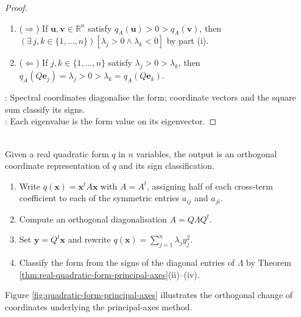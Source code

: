 \begin{theorem}
\begin{proof}
\begin{enumerate}[label=(\roman*)]
\item[$(iv)$] ($\Rightarrow$) If $\mathbf{u},\mathbf{v}\in\mathbb{R}^n$ satisfy $q_A(\mathbf{u})>0>q_A(\mathbf{v})$, then $(\exists\,j,k\in\{1,\ldots,n\})[\lambda_j>0\land\lambda_k<0]$ by part (i).
\item[$(iv)$] ($\Leftarrow$) If $j,k\in\{1,\ldots,n\}$ satisfy $\lambda_j>0>\lambda_k$, then $q_A(Q\mathbf{e}_j)=\lambda_j>0>\lambda_k=q_A(Q\mathbf{e}_k)$.
\end{enumerate}
: Spectral coordinates diagonalise the form; coordinate vectors and the square sum classify its signs.\\
: Each eigenvalue is the form value on its eigenvector.
\end{proof}
\end{theorem}

\begin{computationmethod} \label{meth:quadratic-form-principal-axes} \\
Given a real quadratic form $q$ in $n$ variables, the output is an orthogonal coordinate representation of $q$ and its sign classification.
\begin{enumerate}[label=(\roman*)]
\setlength{\itemsep}{0pt}
\item Write $q(\mathbf{x})=\mathbf{x}^tA\mathbf{x}$ with $A=A^t$, assigning half of each cross-term coefficient to each of the symmetric entries $a_{ij}$ and $a_{ji}$.
\item Compute an orthogonal diagonalisation $A=Q\Lambda Q^t$.
\item Set $\mathbf{y}=Q^t\mathbf{x}$ and rewrite $q(\mathbf{x})=\sum\limits_{j=1}^{n}\lambda_jy_j^2$.
\item Classify the form from the signs of the diagonal entries of $\Lambda$ by Theorem \ref{thm:real-quadratic-form-principal-axes}(ii)--(iv).
\end{enumerate}
\end{computationmethod}

Figure \ref{fig:quadratic-form-principal-axes} illustrates the orthogonal change of coordinates underlying the principal-axes method.

\begin{illustrationfigure}[H]
  \centering
  
  \caption{Orthogonal coordinates reveal the principal axes of a quadratic form.}
  \label{fig:quadratic-form-principal-axes}
\end{illustrationfigure}

